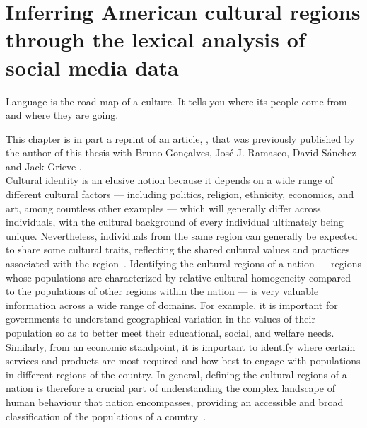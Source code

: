\documentclass[../thesis.tex]{subfiles}
\begin{document}
\chapter[Inferring American cultural regions]{Inferring American cultural regions through the lexical analysis of social media data}
\label{ch:acr}

\epigraph{
  Language is the road map of a culture. It tells you where its people come from and
  where they are going.
}{
}

This chapter is in part a reprint of an article,
, that was previously published by the author of
this thesis with Bruno Gon\c{c}alves, Jos\'{e} J. Ramasco, David S\'{a}nchez and Jack
Grieve \cite{LoufAmericanCultural2022}. \\

Cultural identity is an elusive notion because it depends on a wide range of different
cultural factors --- including politics, religion, ethnicity, economics, and art, among
countless other examples --- which will generally differ across individuals, with the
cultural background of every individual ultimately being unique. Nevertheless,
individuals from the same region can generally be expected to share some cultural
traits, reflecting the shared cultural values and practices associated with the
region~\cite{broek1973geography}. Identifying the cultural regions of a nation ---
regions whose populations are characterized by relative cultural homogeneity compared to
the populations of other regions within the nation --- is very valuable information
across a wide range of domains. For example, it is important for governments to
understand geographical variation in the values of their population so as to better meet
their educational, social, and welfare needs. Similarly, from an economic standpoint, it
is important to identify where certain services and products are most required and how
best to engage with populations in different regions of the country. In general,
defining the cultural regions of a nation is therefore a crucial part of understanding
the complex landscape of human behaviour that nation encompasses, providing an accessible
and broad classification of the populations of a country~\cite{lane2016culture}.
\end{document}
